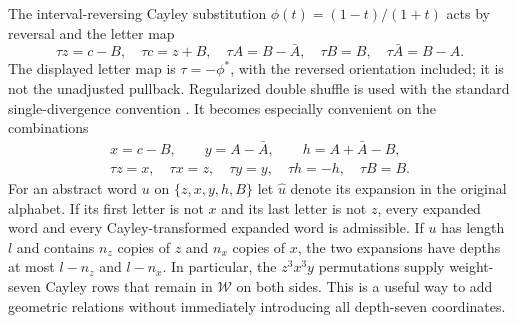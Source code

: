 \documentclass[11pt,a4paper]{article}
\numberwithin{equation}{section}
\theoremstyle{definition}
\theoremstyle{remark}
\begin{document}
The interval-reversing Cayley substitution $\phi(t)=(1-t)/(1+t)$
acts by reversal and the
letter map
\[
 \tau z=c-B,\quad \tau c=z+B,\quad
 \tau A=B-\bar A,\quad \tau B=B,\quad
 \tau\bar A=B-A.
\]
The displayed letter map is $\tau=-\phi^*$, with the reversed
orientation included; it is not the unadjusted pullback. Regularized
double shuffle is used with the standard single-divergence convention
\cite{zhao,racinet}.
It becomes especially convenient on the combinations
\begin{gather*}
 x=c-B,\qquad y=A-\bar A,\qquad h=A+\bar A-B,\\
 \tau z=x,\quad\tau x=z,\quad\tau y=y,\quad
 \tau h=-h,\quad\tau B=B.
\end{gather*}
For an abstract word $u$ on $\{z,x,y,h,B\}$ let $\widehat u$ denote
its expansion in the original alphabet. If its first letter is not
$x$ and its last letter is not $z$, every expanded word and every
Cayley-transformed expanded word is admissible. If $u$ has length $l$
and contains $n_z$ copies of $z$ and $n_x$ copies of $x$, the two
expansions have depths at most $l-n_z$ and $l-n_x$. In particular,
the $z^3x^3y$ permutations supply weight-seven Cayley rows that remain
in $\mathcal W$ on both sides. This is a useful way to add geometric
relations without immediately introducing all depth-seven coordinates.
\end{document}
